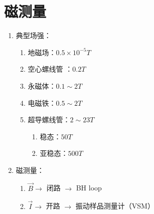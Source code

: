 \chapter{磁测量}

\begin{enumerate}
    \item 典型场强：
    \begin{enumerate}
        \item 地磁场：$0.5 \times 10^{-5}T$
        \item 空心螺线管 ：$0.2T$
        \item 永磁体：$0.1 \sim 2T$
        \item 电磁铁：$0.5 \sim 2T$
        \item 超导螺线管：$2 \sim 23T$
        \begin{enumerate}
            \item 稳态：$50T$
            \item 亚稳态：$500T$
        \end{enumerate}
    \end{enumerate}

    \item 磁测量：
    \begin{enumerate}
        \item $\vec{B} \to$ 闭路 $\to$ BH loop
        \item $\vec{I} \to$ 开路 $\to$ 
            振动样品测量计（VSM）
    \end{enumerate}
\end{enumerate}